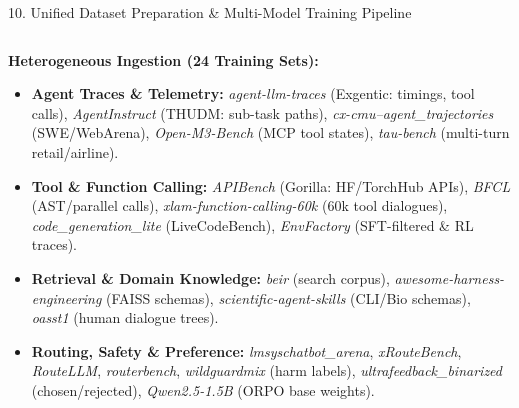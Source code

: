 \documentclass[aspectratio=169,10pt]{beamer}
\begin{document}
\begin{frame}[t]{10. Unified Dataset Preparation \& Multi-Model Training Pipeline}
\vspace{-0.32em}
\centering
\begin{columns}[T]

\begin{column}{0.31\textwidth}
  \begin{tcolorbox}[
    enhanced, arc=3pt, colframe=lavenderDark, colback=white,
    title={\scriptsize\bfseries\faDatabase\ 1. Multi-Source Raw Datasets},
    boxrule=0.55pt, left=2.8pt, right=2.8pt, top=1.8pt, bottom=1.8pt
  ]
  \fontsize{4.6}{5.5}\selectfont
  \textbf{Heterogeneous Ingestion (24 Training Sets):}
  \begin{itemize}\setlength{\itemsep}{0.8pt}
    \item \textbf{Agent Traces \& Telemetry:}
      \textit{agent-llm-traces} (Exgentic: timings, tool calls),
      \textit{AgentInstruct} (THUDM: sub-task paths),
      \textit{cx-cmu--agent\_trajectories} (SWE/WebArena),
      \textit{Open-M3-Bench} (MCP tool states),
      \textit{tau-bench} (multi-turn retail/airline).
    \item \textbf{Tool \& Function Calling:}
      \textit{APIBench} (Gorilla: HF/TorchHub APIs),
      \textit{BFCL} (AST/parallel calls),
      \textit{xlam-function-calling-60k} (60k tool dialogues),
      \textit{code\_generation\_lite} (LiveCodeBench),
      \textit{EnvFactory} (SFT-filtered \& RL traces).
    \item \textbf{Retrieval \& Domain Knowledge:}
      \textit{beir} (search corpus),
      \textit{awesome-harness-engineering} (FAISS schemas),
      \textit{scientific-agent-skills} (CLI/Bio schemas),
      \textit{oasst1} (human dialogue trees).
    \item \textbf{Routing, Safety \& Preference:}
      \textit{lmsyschatbot\_arena}, \textit{xRouteBench},
      \textit{RouteLLM}, \textit{routerbench},
      \textit{wildguardmix} (harm labels),
      \textit{ultrafeedback\_binarized} (chosen/rejected),
      \textit{Qwen2.5-1.5B} (ORPO base weights).
  \end{itemize}
  \end{tcolorbox}
\end{column}


\end{columns}
\end{frame}
\end{document}
